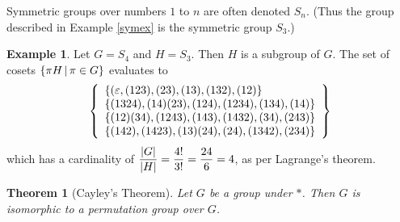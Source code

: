 \documentclass[a4paper,twoside,12pt,openany]{report}
\theoremstyle{plain}
\newtheorem{theorem}{Theorem}
\theoremstyle{definition}
\newtheorem{example}{Example}
\theoremstyle{remark}
\begin{document}
Symmetric groups over numbers \(1\) to \(n\) are often denoted \(S_n\). (Thus the group described in Example \ref{symex} is the symmetric group \(S_3\).)

\begin{example}
	Let \(G=S_4\) and \(H=S_3\). Then \(H\) is a subgroup of \(G\).
	The set of cosets \(\left\{ \pi H \,\middle|\, \pi\in G \right\}\) evaluates to 
	\[
		\left\{\begin{array}{l}
			\left\{ (\varepsilon,  (1  2  3),  (2  3),  (1  3),  (1  3  2),  (1  2) \right\}\\
			\left\{ (1  3  2  4),  (1  4)  (2  3),  (1  2  4),  (1  2  3  4),  (1  3  4),  (1  4) \right\}\\
			\left\{ (1  2)  (3  4),  (1  2  4  3),  (1  4  3),  (1  4  3  2),  (3  4),  (2  4  3) \right\}\\
			\left\{ (1  4  2),  (1  4  2  3),  (1  3)  (2  4),  (2  4),  (1  3  4  2),  (2  3  4) \right\}
		\end{array}\right\}
	\]
	which has a cardinality of \(\dfrac{\left|G\right|}{\left|H\right|}=\dfrac{4!}{3!}=\dfrac{24}{6}=4\), as per Lagrange's theorem.
\end{example}

\begin{theorem}[Cayley's Theorem]
	Let \(G\) be a group under \(*\). Then \(G\) is isomorphic to a 
	permutation group over \(G\).
\end{theorem}
\end{document}
